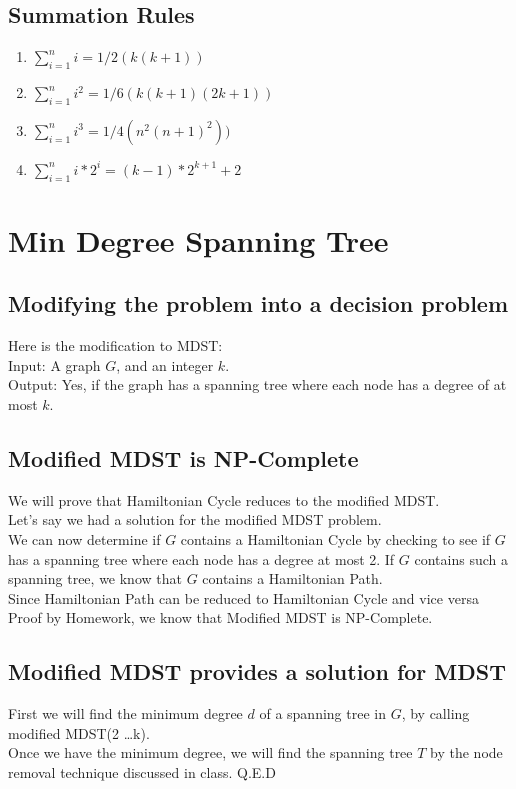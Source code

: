 \documentclass[8pt,twocolumn]{article}
\begin{document}
\subsection{ Summation Rules}
\begin{enumerate}
    \item $\sum_{i = 1}^n i = 1/2(k(k+1))$
    \item $\sum_{i = 1}^n i^2 = 1/6(k(k+1)(2k+1))$
    \item $\sum_{i = 1}^n i^3 = 1/4(n^2 (n+1)^2))$
    \item $\sum_{i = 1}^n i * 2^i = (k-1) * 2^{k+1} + 2$
\end{enumerate}

\section{ Min Degree Spanning Tree }
\subsection{Modifying the problem into a decision problem}
Here is the modification to MDST:\\
Input: A graph $G$, and an integer $k$.\\
Output: Yes, if the graph has a spanning tree where each node has a degree of at most $k$.\\
\subsection{Modified MDST is NP-Complete}
We will prove that Hamiltonian Cycle reduces to the modified MDST.\\
Let's say we had a solution for the modified MDST problem.\\
We can now determine if $G$ contains a Hamiltonian Cycle by checking to see if $G$ has a spanning tree where each node has a degree at most 2. If $G$ contains such a spanning tree, we know that $G$ contains a Hamiltonian Path.\\
Since Hamiltonian Path can be reduced to Hamiltonian Cycle and vice versa {Proof by Homework}, we know that Modified MDST is NP-Complete.
\subsection{Modified MDST provides a solution for MDST}
First we will find the minimum degree $d$ of a spanning tree in $G$, by calling modified MDST(2 \dots k).\\
Once we have the minimum degree, we will find the spanning tree $T$ by the node removal technique discussed in class.
Q.E.D
\end{document}
